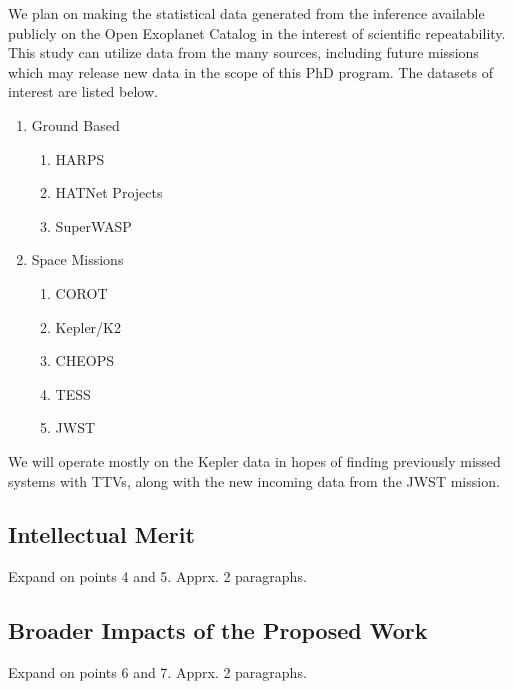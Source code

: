 We plan on making the statistical data generated from the inference available publicly on the Open Exoplanet Catalog in the interest of scientific repeatability.
This study can utilize data from the many sources, including future missions which may release new data in the scope of this PhD program. 
The datasets of interest are listed below.
\begin{enumerate}
      \item Ground Based
		\begin{enumerate}
      		\item HARPS
      		\item HATNet Projects
      		\item SuperWASP
      		\end{enumerate}
      \item Space Missions
      		\begin{enumerate}
            	\item COROT
      		\item Kepler/K2
           	\item CHEOPS
      		\item TESS
           	 \item JWST
      		\end{enumerate}
 \end{enumerate}
We will operate mostly on the Kepler data in hopes of finding previously missed systems with TTVs, along with the new incoming data from the JWST mission.

\subsection{Intellectual Merit} 
Expand on points 4 and 5. Apprx. 2 paragraphs.
\subsection{Broader Impacts of the Proposed Work} 
Expand on points 6 and 7. Apprx. 2 paragraphs.
